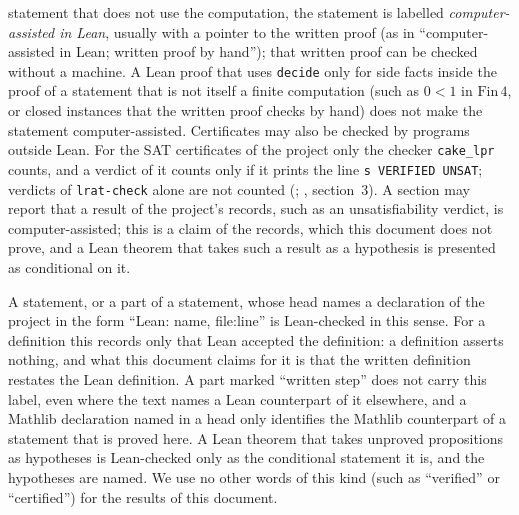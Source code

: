 \begin{itemize}
  statement that does not use the computation, the statement is labelled \emph{computer-assisted in
  Lean}, usually with a pointer to the written proof (as in ``computer-assisted in Lean; written proof by
  hand''); that written proof can be checked without a machine. A Lean proof that uses \texttt{decide}
  only for side facts inside the proof of a statement that is not itself a finite computation (such as
  $0<1$ in $\mathrm{Fin}\,4$, or closed instances that the written proof checks by hand) does not make the
  statement computer-assisted. Certificates may also be checked by programs outside Lean. For the SAT
  certificates of the project only the checker \texttt{cake\_lpr} counts, and a verdict of it counts only
  if it prints the line \texttt{s VERIFIED UNSAT}; verdicts of \texttt{lrat-check} alone are not counted
  (; , section~3). A section may report that
  a result of the project's records, such as an unsatisfiability verdict, is computer-assisted; this is a
  claim of the records, which this document does not prove, and a Lean theorem that takes such a result
  as a hypothesis is presented as conditional on it.
\end{itemize}
A statement, or a part of a statement, whose head names a declaration of the project in the form
``Lean: name, file:line'' is Lean-checked in this sense. For a definition this records only that Lean
accepted the definition: a definition asserts nothing, and what this document claims for it is that the
written definition restates the Lean definition. A part marked ``written step'' does not carry this
label, even where the text names a Lean counterpart of it elsewhere, and a Mathlib declaration named in a
head only identifies the Mathlib counterpart of a statement that is proved here. A Lean theorem that
takes unproved propositions as hypotheses is Lean-checked only as the conditional statement it is, and
the hypotheses are named. We use no other words of this kind (such as ``verified'' or ``certified'') for
the results of this document.

